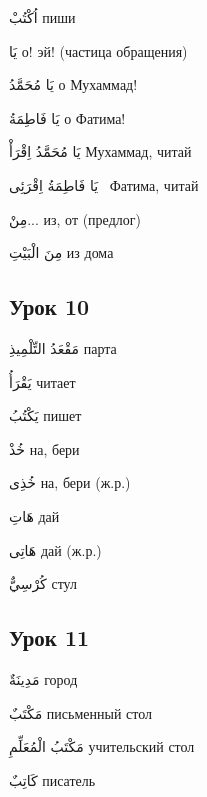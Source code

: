 \documentclass[a5paper]{article}
\newcommand\textstyleDropCaps[1]{#1}
\newcommand\textstyleCaptioncharacters[1]{#1}
\begin{document}
\textstyleCaptioncharacters{اُكْتُبْ }\textstyleDropCaps{пиши‎}

\textstyleCaptioncharacters{يَا }\textstyleDropCaps{о! эй! (частица обраще­ния)‎}

\textstyleCaptioncharacters{يَا مُحَمَّدُ }\textstyleDropCaps{о Мухаммад!‎}

\textstyleCaptioncharacters{يَا فَاطِمَةُ }\textstyleDropCaps{о Фатима!‎}

\textstyleCaptioncharacters{يَا مُحَمَّدُ اِقْرَأْ }\textstyleDropCaps{Мухам­мад, читай‎}

\textstyleCaptioncharacters{يَا فَاطِمَةُ اِقْرَئِى \ }\textstyleDropCaps{Фатим­а, читай‎}

\textstyleCaptioncharacters{مِنْ...ِ }\textstyleDropCaps{из, от (предлог)‎}

\textstyleCaptioncharacters{مِنَ الْبَيْتِ }\textstyleDropCaps{из дома‎}

\subsection[Урок 10‎]{\textstyleDropCaps{Урок 10‎}}
\textstyleCaptioncharacters{مَقْعَدُ التِّلْمِيذِ }\textstyleDropCaps{парта‎}

\textstyleCaptioncharacters{يَقْرَأُ }\textstyleDropCaps{читает‎}

\textstyleCaptioncharacters{يَكْتُبُ }\textstyleDropCaps{пишет‎}

\textstyleCaptioncharacters{خُذْ }\textstyleDropCaps{на, бери‎}

\textstyleCaptioncharacters{خُذِى }\textstyleDropCaps{на, бери (ж.р.)‎}

\textstyleCaptioncharacters{هَاتِ }\textstyleDropCaps{дай‎}

\textstyleCaptioncharacters{هَاتِى }\textstyleDropCaps{дай (ж.р.)‎}

\textstyleCaptioncharacters{كُرْسِيٌّ }\textstyleDropCaps{стул‎}

\subsection[Урок 11‎]{\textstyleDropCaps{Урок 11‎}}
\textstyleCaptioncharacters{مَدِينَةٌ }\textstyleDropCaps{город‎}

\textstyleCaptioncharacters{مَكْتَبٌ }\textstyleDropCaps{письменный стол‎}

\textstyleCaptioncharacters{مَكْتَبُ الْمُعَلِّمِ }\textstyleDropCaps{учитель­ский стол‎}

\textstyleCaptioncharacters{كَاتِبٌ }\textstyleDropCaps{писатель‎}
\end{document}
